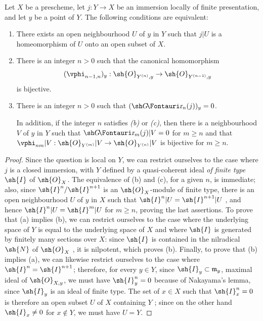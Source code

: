 \begin{proposition}[16.1.9]
\label{IV.16.1.9}
Let $X$ be a prescheme, let $j: Y \to X$ be an immersion locally of finite presentation, and let $y$ be a point of $Y$. The following conditions are equivalent:
\begin{enumerate}
  \item[(a)] There exists an open neighbourhood $U$ of $y$ in $Y$ such that $j|U$ is a homeomorphism of $U$ onto an open subset of $X$.
  \item[(b)] There is an integer $n>0$ such that the canonical homomorphism
  \[
    (\vphi_{n-1,n})_y: \sh{O}_{Y^{(n)},y} \to \sh{O}_{Y^{(n-1)},y}
  \]
  is bijective.
  \item[(c)] There is an integer $n>0$ such that $(\shGr_n(j))_y = 0$.
  
  In addition, if the integer $n$ satisfies \emph{(b)} or \emph{(c)}, then there is a neighbourhood $V$ of $y$ in $Y$ such that $\shGr_m(j)|V = 0$ for $m \geq n$ and that $\vphi_{nm}|V: \sh{O}_{Y^{(m)}}|V \to \sh{O}_{Y^{(n)}}|V$ is bijective for $m \geq n$. 
\end{enumerate}
\end{proposition}

\begin{proof}
Since the question is local on $Y$, we can restrict ourselves to the case where $j$ is a closed immersion, with $Y$ defined by a quasi-coherent ideal \emph{of finite type} $\sh{I}$ of $\sh{O}_X$.
The equivalence of (b) and (c), for a given $n$, is immediate;
also, since $\sh{I}^n/\sh{I}^{n+1}$ is an $\sh{O}_X$-module of finite type, there is an open neighbourhood $U$ of $y$ in $X$ such that $\sh{I}^n|U = \sh{I}^{n+1}|U$ , and hence $\sh{I}^n|U = \sh{I}^m|U$ for $m \geq n$, proving the last assertions.
To prove that (a) implies (b), we can restrict ourselves to the case where the underlying space of $Y$ is equal to the underlying space of $X$ and where $\sh{I}$ is generated by finitely many sections over $X$:
since $\sh{I}$ is contained in the nilradical $\sh{N}$ of $\sh{O}_X$ , it is nilpotent, which proves (b).
Finally, to prove that (b) implies (a), we can likewise restrict ourselves to the case where $\sh{I}^n = \sh{I}^{n+1}$;
therefore, for every $y \in Y$, since $\sh{I}_y \subset \mathfrak{m}_y$, maximal ideal of $\sh{O}_{X,y}$, we must have $\sh{I}^n_y = 0$ because of Nakayama's lemma, since $\sh{I}_y$ is an ideal of finite type.
The set of $x \in X$ such that $\sh{I}^n_x = 0$ is therefore an open subset $U$ of $X$ containing $Y$ ;
since on the other hand $\sh{I}_x \neq 0$ for $x \notin Y$, we must have $U = Y$.
\end{proof}

